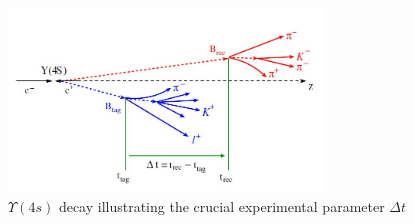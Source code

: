 \begin{figure}[h]
\centering
\includegraphics[width=0.75\textwidth]{figs/dt.JPG}
\caption{$\Upsilon (4s)$ decay illustrating the crucial experimental parameter $\Delta t$}
\label{BBD}
\end{figure}


